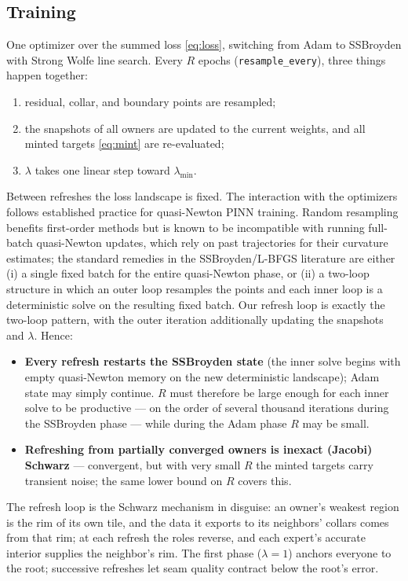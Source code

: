 \documentclass[11pt]{article}
\begin{document}
\subsection*{Training}
One optimizer over the summed loss \eqref{eq:loss}, switching from Adam
to SSBroyden with Strong Wolfe line search. Every $R$ epochs
(\texttt{resample\_every}), three things happen together:
\begin{enumerate}
\item residual, collar, and boundary points are resampled;
\item the snapshots of all owners are updated to the current weights,
and all minted targets \eqref{eq:mint} are re-evaluated;
\item $\lambda$ takes one linear step toward $\lambda_{\min}$.
\end{enumerate}
Between refreshes the loss landscape is fixed. The interaction with the
optimizers follows established practice for quasi-Newton PINN training.
Random resampling benefits first-order methods but is known to be
incompatible with running full-batch quasi-Newton updates, which rely on
past trajectories for their curvature estimates; the standard remedies
in the SSBroyden/L-BFGS literature are either (i) a single fixed batch
for the entire quasi-Newton phase, or (ii) a two-loop structure in which
an outer loop resamples the points and each inner loop is a
deterministic solve on the resulting fixed batch. Our refresh loop is
exactly the two-loop pattern, with the outer iteration additionally
updating the snapshots and $\lambda$. Hence:
\begin{itemize}
\item \textbf{Every refresh restarts the SSBroyden state} (the inner
solve begins with empty quasi-Newton memory on the new deterministic
landscape); Adam state may simply continue. $R$ must therefore be large
enough for each inner solve to be productive --- on the order of several
thousand iterations during the SSBroyden phase --- while during the Adam
phase $R$ may be small.
\item \textbf{Refreshing from partially converged owners is inexact
(Jacobi) Schwarz} --- convergent, but with very small $R$ the minted
targets carry transient noise; the same lower bound on $R$ covers this.
\end{itemize}
The refresh loop is the Schwarz mechanism in disguise: an owner's
weakest region is the rim of its own tile, and the data it exports to
its neighbors' collars comes from that rim; at each refresh the roles
reverse, and each expert's accurate interior supplies the neighbor's
rim. The first phase ($\lambda = 1$) anchors everyone to the root;
successive refreshes let seam quality contract below the root's error.
\end{document}
